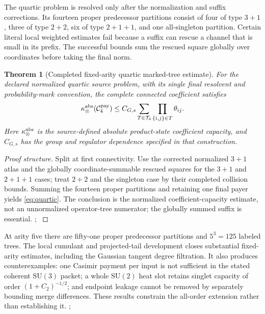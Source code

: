 \documentclass[11pt,oneside,openany]{book}
\newtheorem{theorem}{Theorem}[chapter]
\theoremstyle{definition}
\theoremstyle{remark}
\newcommand{\SU}{\mathrm{SU}}
\newcommand{\src}[2]{\cite[#2]{#1}}
\begin{document}
The quartic problem is resolved only after the normalization and suffix corrections. Its fourteen proper predecessor partitions consist of four of type $3+1$, three of type $2+2$, six of type $2+1+1$, and one all-singleton partition. Certain literal local weighted estimates fail because a suffix can rescue a channel that is small in its prefix. The successful bounds sum the rescued square globally over coordinates before taking the final norm.

\begin{theorem}[Completed fixed-arity quartic marked-tree estimate]\label{thm:quartic}
For the declared normalized quartic source problem, with its single final resolvent and probability-mark convention, the complete connected coefficient satisfies
\begin{equation}\label{eq:quartic}
\kappa_{\otimes}^{\rm abs}(\mathcal C^{\rm pay}_4)
\le C_{G,s}\sum_{T\in\mathcal T_4}\prod_{\{i,j\}\in T}\theta_{ij}.
\end{equation}
Here $\kappa_{\otimes}^{\rm abs}$ is the source-defined absolute product-state coefficient capacity, and $C_{G,s}$ has the group and regulator dependence specified in that construction.
\end{theorem}
\begin{proof}[Proof structure]
Split at first connectivity. Use the corrected normalized $3+1$ atlas and the globally coordinate-summable rescued squares for the $3+1$ and $2+1+1$ cases; treat $2+2$ and the singleton case by their completed collision bounds. Summing the fourteen proper partitions and retaining one final payer yields \cref{eq:quartic}. The conclusion is the normalized coefficient-capacity estimate, not an unnormalized operator-tree numerator; the globally summed suffix is essential. \src{F3}{V89--V96}; \src{F4}{inherited quartic ledger}
\end{proof}

At arity five there are fifty-one proper predecessor partitions and $5^3=125$ labeled trees. The local cumulant and projected-tail development closes substantial fixed-arity estimates, including the Gaussian tangent degree filtration. It also produces counterexamples: one Casimir payment per input is not sufficient in the stated coherent $\SU(3)$ packet; a whole $\SU(2)$ heat slot retains singlet capacity of order $(1+C_2)^{-1/2}$; and endpoint leakage cannot be removed by separately bounding merge differences. These results constrain the all-order extension rather than establishing it. \src{F3}{V97--V100}; \src{F4}{quintic and projected-tail developments}
\end{document}
